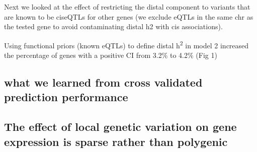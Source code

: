 \documentclass[]{article}
\begin{document}
%

Next we looked at the effect of restricting the distal component to variants that are known to be ciseQTLs for other genes (we exclude eQTLs in the same chr as the tested gene to avoid contaminating distal h2 with cis associations). 

Using
functional priors (known eQTLs) to define distal h\textsuperscript{2} in
model 2 increased the percentage of genes with a positive CI from 3.2\%
to 4.2\% (Fig 1)

\subsection{what we learned from cross validated prediction performance}

\subsection{The effect of local genetic variation on gene expression is
sparse rather than
polygenic}\label{the-effect-of-local-genetic-variation-on-gene-expression-is-sparse-rather-than-polygenic}
\end{document}
